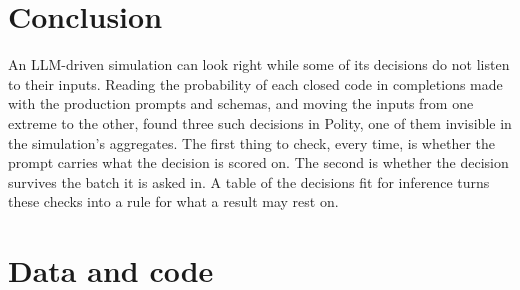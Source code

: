 \documentclass[11pt]{article}
\begin{document}
\section{Conclusion}

An LLM-driven simulation can look right while some of its decisions do not listen to their
inputs. Reading the probability of each closed code in completions made with the production
prompts and schemas, and
moving the inputs from one extreme to the other, found three such decisions in Polity, one of
them invisible in the simulation's aggregates. The first thing to check, every time, is
whether the prompt carries what the decision is scored on. The second is whether the decision
survives the batch it is asked in. A table of the decisions fit for inference turns these checks
into a rule for what a result may rest on.

\section*{Data and code}
\begingroup\raggedright
\end{document}
